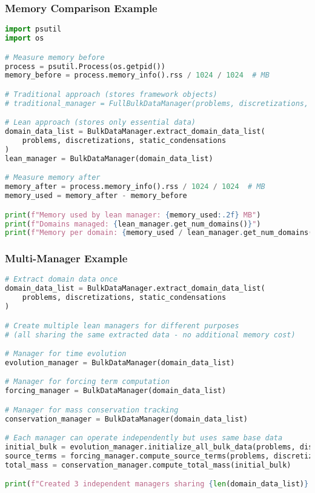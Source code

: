 \subsubsection{Memory Comparison Example}

\begin{lstlisting}[language=Python, caption=Memory Usage Comparison]
import psutil
import os

# Measure memory before
process = psutil.Process(os.getpid())
memory_before = process.memory_info().rss / 1024 / 1024  # MB

# Traditional approach (stores framework objects)
# traditional_manager = FullBulkDataManager(problems, discretizations, static_condensations)

# Lean approach (stores only essential data)
domain_data_list = BulkDataManager.extract_domain_data_list(
    problems, discretizations, static_condensations
)
lean_manager = BulkDataManager(domain_data_list)

# Measure memory after
memory_after = process.memory_info().rss / 1024 / 1024  # MB
memory_used = memory_after - memory_before

print(f"Memory used by lean manager: {memory_used:.2f} MB")
print(f"Domains managed: {lean_manager.get_num_domains()}")
print(f"Memory per domain: {memory_used / lean_manager.get_num_domains():.2f} MB")
\end{lstlisting}

\subsubsection{Multi-Manager Example}

\begin{lstlisting}[language=Python, caption=Multiple Lean Managers from Same Data]
# Extract domain data once
domain_data_list = BulkDataManager.extract_domain_data_list(
    problems, discretizations, static_condensations
)

# Create multiple lean managers for different purposes
# (all sharing the same extracted data - no additional memory cost)

# Manager for time evolution
evolution_manager = BulkDataManager(domain_data_list)

# Manager for forcing term computation
forcing_manager = BulkDataManager(domain_data_list)

# Manager for mass conservation tracking  
conservation_manager = BulkDataManager(domain_data_list)

# Each manager can operate independently but uses same base data
initial_bulk = evolution_manager.initialize_all_bulk_data(problems, discretizations)
source_terms = forcing_manager.compute_source_terms(problems, discretizations, time=0.0)
total_mass = conservation_manager.compute_total_mass(initial_bulk)

print(f"Created 3 independent managers sharing {len(domain_data_list)} domain data objects")
\end{lstlisting}

